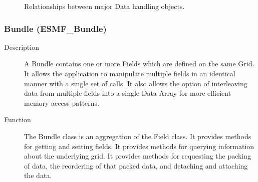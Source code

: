 \begin{figure}
\caption[{Data Object Hierarchy}]{Relationships between major 
Data handling objects.}
\label{fig:datahier}
\end{figure}



\subsubsection{Bundle (ESMF\_Bundle)}
\label{sec:bundle} 
\begin{description}
\item [Description] A Bundle contains one or more Fields which are defined on 
the same Grid.  It allows the application to manipulate multiple fields in 
an identical manner with a single set of calls.  It also allows the option 
of interleaving data from multiple fields into a single Data Array for 
more efficient memory access patterns.  
\item [Function] The Bundle class is an aggregation of the Field class.  
It provides methods for getting and setting fields.  It provides methods 
for querying information about the
underlying grid.  It provides methods for requesting the packing of data, the
reordering of that packed data, and detaching and attaching the data.
\end{description}


